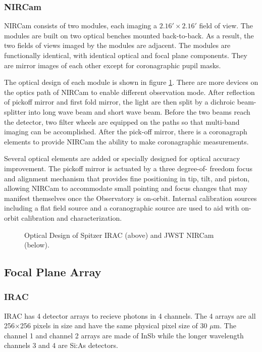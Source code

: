 \documentclass[preprint, 12pt]{aastex}
\begin{document}
\subsubsection{NIRCam}
NIRCam consists of two modules, each imaging a $2.16' \times 2.16'$
field of view.  The modules are built on two optical benches mounted
back-to-back. As a result, the two fields of views imaged by the
modules are adjacent.  The modules are functionally identical, with
identical optical and focal plane components. They are mirror images
of each other except for coronagraphic pupil masks.

The optical design of each module is shown in figure
\ref{fig:optics}. There are more devices on the optics path of NIRCam to enable
different observation mode. After reflection of pickoff mirror and
first fold mirror, the light are then split by a dichroic
beam-splitter into long wave beam and short wave beam. Before the two
beams reach the detector, two filter wheels are equipped on the paths
so that multi-band imaging can be accomplished. After the pick-off
mirror, there is a coronagraph elements to provide NIRCam the ability
to make coronagraphic measurements.

Several optical elements are added
or specially designed for optical accuracy improvement. The pickoff
mirror is actuated by a three degree-of- freedom focus and alignment
mechanism that provides fine positioning in tip, tilt, and piston,
allowing NIRCam to accommodate small pointing and focus changes that
may manifest themselves once the Observatory is on-orbit. Internal
calibration sources including a flat field source and a coranographic
source are used to aid with on-orbit calibration and characterization. 


\begin{figure}
  \centering
  \caption{Optical Design of Spitzer IRAC (above) and JWST NIRCam (below).}
  \label{fig:optics}
\end{figure}

\subsection{Focal Plane Array}

\subsubsection{IRAC}
IRAC has 4 detector arrays to recieve photons in 4 channels. The 4
arrays are all 256$\times$256 pixels in size and have the same
physical pixel size of 30 $\mu$m. The channel 1 and channel 2 arrays
are made of InSb while the longer wavelength channels 3 and 4 are
Si:As detectors.
\end{document}
